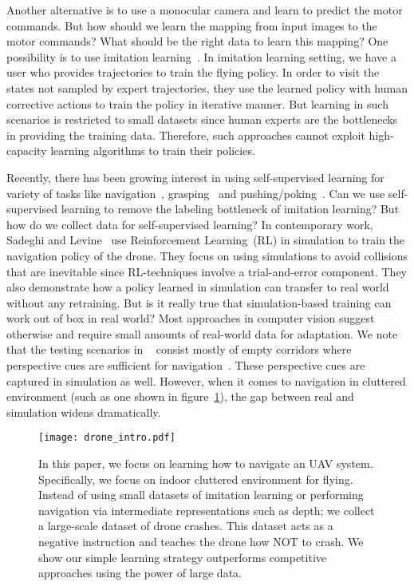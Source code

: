 \documentclass[letterpaper, 10 pt, conference]{ieeeconf}  %
\begin{document}
Another alternative is to use a monocular camera and learn to predict the motor commands. But how should we learn the mapping from input images to the motor commands? What should be the right data to learn this mapping? One possibility is to use imitation learning~\cite{ross2013learning}. In imitation learning setting, we have a user who provides trajectories to train the flying policy. In order to visit the states not sampled by expert trajectories, they use the learned policy with human corrective actions to train the policy in iterative manner. But learning in such scenarios is restricted to small datasets since human experts are the bottlenecks in providing the training data. Therefore, such approaches cannot exploit high-capacity learning algorithms to train their policies.

Recently, there has been growing interest in using self-supervised learning for variety of tasks like navigation~\cite{zhu2016target}, grasping~\cite{pinto2016supersizing} and pushing/poking~\cite{agrawal2016learning}. Can we use self-supervised learning to remove the labeling bottleneck of imitation learning? But how do we collect data for self-supervised learning? In contemporary work, Sadeghi and Levine~\cite{DBLP:journals/corr/SadeghiL16} use Reinforcement Learning~(RL) in simulation to train the navigation policy of the drone. They focus on using simulations to avoid collisions that are inevitable since RL-techniques involve a trial-and-error component. They also demonstrate how a policy learned in simulation can transfer to real world without any retraining. But is it really true that simulation-based training can work out of box in real world? Most approaches in computer vision suggest otherwise and require small amounts of real-world data for adaptation. We note that the testing scenarios in ~\cite{DBLP:journals/corr/SadeghiL16} consist mostly of empty corridors where perspective cues are sufficient for navigation~\cite{bills2011autonomous}. These perspective cues are captured in simulation as well. However, when it comes to navigation in cluttered environment (such as one shown in figure~\ref{fig:drone_intro}), the gap between real and simulation widens dramatically.
\begin{figure}[t!]
\label{fig:drone_intro}
\centering
\texttt{[image: drone\_intro.pdf]}
\caption{In this paper, we focus on learning how to navigate an UAV system. Specifically, we focus on indoor cluttered environment for flying. Instead of using small datasets of imitation learning or performing navigation via intermediate representations such as depth; we collect a large-scale dataset of drone crashes. This dataset acts as a negative instruction and teaches the drone how NOT to crash. We show our simple learning strategy outperforms competitive approaches using the power of large data.
}
\end{figure}
\end{document}
